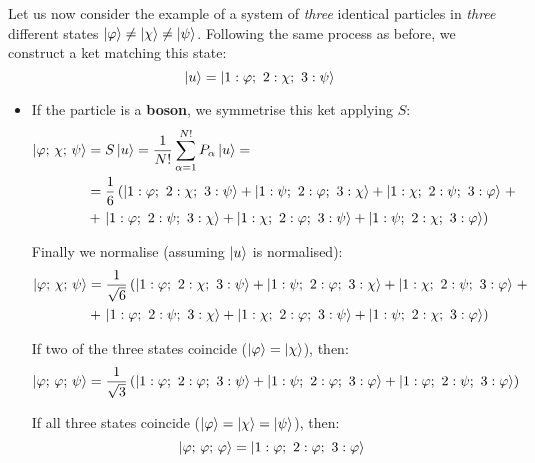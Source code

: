 Let us now consider the example of a system of \textit{three} identical particles in \textit{three} different states $\ket{\varphi}\neq \ket{\chi}\neq \ket{\psi}$. Following the same process as before, we construct a ket matching this state:
\begin{equation}
    \ket{u} = \ket{1:\varphi;\ 2:\chi;\ 3: \psi}
\end{equation} 

\begin{itemize}
    \item If the particle is a \textbf{boson}, we symmetrise this ket applying $S$:
    \begin{equation}
        \begin{split}
            \ket{\varphi;\, \chi;\, \psi} &= S\ket{u} = \frac{1}{N!}\sum_{\alpha=1}^{N!} P_\alpha\ket{u} = \\
            &= \frac{1}{6} \left(\ket{1:\varphi;\ 2:\chi;\ 3: \psi} + \ket{1:\psi;\ 2:\varphi;\ 3: \chi} + \ket{1:\chi;\ 2:\psi;\ 3: \varphi}\right. +\\ 
            &+ \left.\ket{1:\varphi;\ 2:\psi;\ 3: \chi} + \ket{1:\chi;\ 2:\varphi;\ 3: \psi} + \ket{1:\psi;\ 2:\chi;\ 3: \varphi}\right)
        \end{split}
    \end{equation}

    Finally we normalise (assuming $\ket{u}$ is normalised):
    \begin{equation}
        \begin{split}
            \ket{\varphi;\, \chi;\, \psi} &= \frac{1}{ \sqrt{6}} \left(\ket{1:\varphi;\ 2:\chi;\ 3: \psi} + \ket{1:\psi;\ 2:\varphi;\ 3: \chi} + \ket{1:\chi;\ 2:\psi;\ 3: \varphi}\right. +\\ 
            &+ \left.\ket{1:\varphi;\ 2:\psi;\ 3: \chi} + \ket{1:\chi;\ 2:\varphi;\ 3: \psi} + \ket{1:\psi;\ 2:\chi;\ 3: \varphi}\right)
        \end{split}
    \end{equation}
    
    If two of the three states coincide ($\ket{\varphi} = \ket{\chi}$), then:
    \begin{equation}
        \ket{\varphi;\, \varphi;\, \psi} = \frac{1}{ \sqrt{3}} \left(\ket{1:\varphi;\ 2:\varphi;\ 3: \psi} + \ket{1:\psi;\ 2:\varphi;\ 3: \varphi} + \ket{1:\varphi;\ 2:\psi;\ 3: \varphi}\right)
    \end{equation}

    If all three states coincide ($\ket{\varphi} = \ket{\chi}=\ket{\psi}$), then:
    \begin{equation}
        \ket{\varphi;\, \varphi;\, \varphi} = \ket{1:\varphi;\ 2:\varphi;\ 3: \varphi}
    \end{equation}


\end{itemize}
